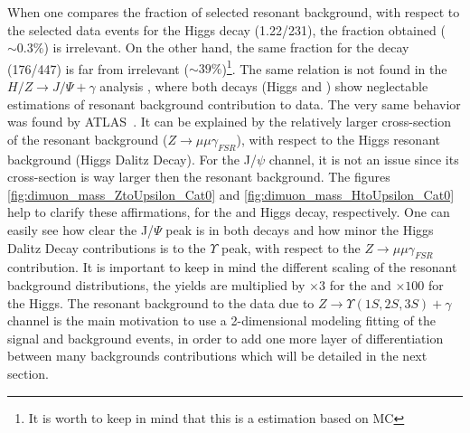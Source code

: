 When one compares the fraction of selected resonant background, with respect to the selected data events for the Higgs decay (1.22/231), the fraction obtained ($\sim0.3\%$) is irrelevant. On the other hand, the same fraction for the \Z decay (176/447) is far from irrelevant ($\sim39\%$)\footnote{It is worth to keep in mind that this is a estimation based on MC}. The same relation is not found in the $H/Z \rightarrow J/\Psi + \gamma$ analysis \cite{papper_jpsi}, where both decays (Higgs and \Z) show neglectable estimations of resonant background contribution to data. 
The very same behavior was found by ATLAS~\cite{atlas_paper:PhysRevLett.114.121801}. It can be explained by the relatively larger cross-section of the \Z resonant background ($Z \rightarrow \mu\mu\gamma_{FSR}$), with respect to the Higgs resonant background (Higgs Dalitz Decay). For the J/$\psi$ channel, it is not an issue since its  cross-section is way larger then the resonant background. The figures \ref{fig:dimuon_mass_ZtoUpsilon_Cat0} and \ref{fig:dimuon_mass_HtoUpsilon_Cat0} help to clarify these affirmations, for the \Z and Higgs decay, respectively. 
One can easily see how clear the J/$\Psi$ peak is in both decays and how minor the Higgs Dalitz Decay contributions is to the $\Upsilon$ peak, with respect to the $Z \rightarrow \mu\mu\gamma_{FSR}$ contribution. It is important to keep in mind the different scaling of the resonant background distributions, the yields are multiplied by $\times 3$ for the \Z and $\times 100$ for the Higgs.
The resonant background to the data due to $Z \rightarrow \Upsilon(1S,2S,3S) + \gamma$ channel  is the main motivation to use a 2-dimensional modeling fitting of the signal and background events, in order to add one more layer of differentiation between many backgrounds contributions which will be detailed in the next section.

